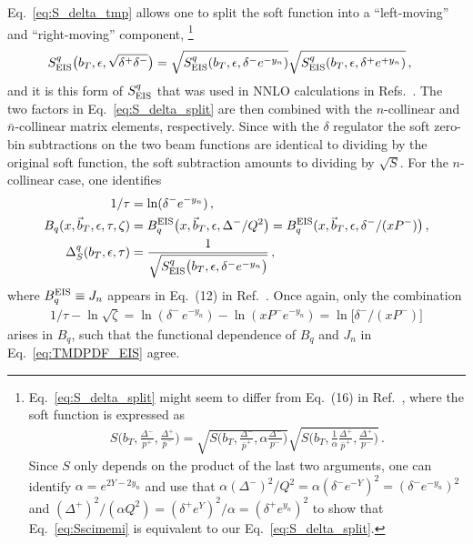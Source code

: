 \documentclass[11pt,a4paper]{article}
\DeclareRobustCommand{\eq}[1]{Eq.~\eqref{eq:#1}}
\DeclareRobustCommand{\mycite}[1]{Ref.~\cite{#1}}
\DeclareRobustCommand{\mycites}[1]{Refs.~\cite{#1}}
\newcommand{\eps}{\epsilon}
\newcommand{\nn}{\nonumber}
\newcommand{\bn}{{\bar{n}}}
\newcommand{\bt}{\vec b_T}
\begin{document}
\eq{S_delta_tmp} allows one to split the soft function into a ``left-moving'' and ``right-moving'' component,%
\footnote
{
   \eq{S_delta_split} might seem to differ from Eq.~(16) in \mycite{Echevarria:2012js}, where the soft function is expressed as
   \begin{align} \label{eq:Sscimemi}
   S\biggl(b_T, \frac{\Delta^-}{p^+},  \frac{\Delta^+}{\bar p^-}\biggr)
   =  \sqrt{S\biggl(b_T, \frac{\Delta^-}{\bar p^+}, \alpha \frac{\Delta^-}{ p^-}\biggr)}
      \sqrt{S\biggl(b_T, \frac{1}{\alpha} \frac{\Delta^+}{\bar p^+}, \frac{\Delta^+}{ p^-}\biggr)}
   \,.\end{align}
   Since $S$ only depends on the product of the last two arguments, one can identify $\alpha= e^{2 Y-2y_n}$ and use that $\alpha (\Delta^-)^2/Q^2 = \alpha (\delta^- e^{-Y})^2= (\delta^- e^{-y_n})^2$ and $(\Delta^+)^2/(\alpha Q^2) = (\delta^+ e^Y)^2/\alpha = (\delta^+ e^{y_n})^2$ to show that \eq{Sscimemi} is equivalent to our \eq{S_delta_split}.
}
\begin{align} \label{eq:S_delta_split}
 S^q_{\rm EIS}\bigl(b_T, \eps, \sqrt{\delta^+ \delta^-}\bigr) &
 = \sqrt{ S^q_{\rm EIS}(b_T,\eps, \delta^- e^{-y_n})} \sqrt{ S^q_{\rm EIS}(b_T,\eps, \delta^+ e^{+y_n})}
\,,\end{align}
and it is this form of $S^q_{\rm EIS}$ that was used in NNLO calculations in \mycites{Echevarria:2015usa,Echevarria:2015byo,Echevarria:2016scs}.
The two factors in \eq{S_delta_split} are then combined with the $n$-collinear and $\bn$-collinear matrix elements, respectively.
Since with the $\delta$ regulator the soft zero-bin subtractions on the two beam functions are identical to dividing by the original soft function, the soft subtraction amounts to dividing by $\sqrt{S}$.
For the $n$-collinear case, one identifies
\begin{align} \label{eq:TMDPDF_EIS}
 1/\tau &= \ln( \delta^- e^{-y_n} )
\,,\nn\\
 B_q(x,\bt,\epsilon,\tau,\zeta) &= B_q^{\rm EIS}\bigl(x, \bt, \eps, \Delta^-/Q^2\bigr) =  B_q^{\rm EIS}(x, \bt, \eps, \delta^-/(x P^-)\bigr)
\,,\nn\\
 \Delta_S^q(b_T,\epsilon,\tau) &= \frac{1}{\sqrt{S^q_{\rm EIS}\bigl(b_T,\eps, \delta^- e^{-y_n}\bigr)} }
\,,\end{align}
where $B_q^{\rm EIS} \equiv J_n$ appears in Eq.~(12) in \mycite{Echevarria:2012js}.
Once again, only the combination
\begin{align}
 1/\tau - \ln\sqrt{\zeta} = \ln( \delta^-\, e^{-y_n} ) - \ln(x P^- e^{-y_n}) = \ln\bigl[\delta^-/(xP^-)\bigr]
\end{align}
arises in $B_q$, such that the functional dependence of $B_q$ and $J_n$ in \eq{TMDPDF_EIS} agree.
\end{document}
